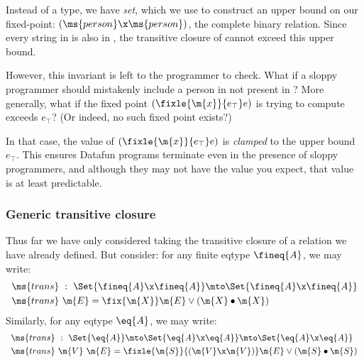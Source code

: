 Instead of a  type, we have  \emph{set}, which we use to
construct an upper bound on our fixed-point: $(\ms{person} \x \ms{person})$, the
complete binary relation. Since every string in  is also in
, the transitive closure of  cannot exceed this upper
bound.

However, this invariant is left to the programmer to check. What if a sloppy
programmer should mistakenly include a person in  not present in
? More generally, what if the fixed point $(\fixle{\m{x}}{e_\top} e)$
is trying to compute exceeds $e_\top$? (Or indeed, no such fixed point exists?)

In that case, the value of $(\fixle{\m{x}}{e_\top} e)$ is \emph{clamped} to the
upper bound $e_\top$. This ensures Datafun programs terminate even in the
presence of sloppy programmers, and although they may not have the value you
expect, that value is at least predictable.


\subsubsection{Generic transitive closure}

Thus far we have only considered taking the transitive closure of a relation we
have already defined. But consider: for any finite eqtype $\fineq{A}$, we may
write:
\[\begin{array}{l}
\ms{trans} ~:~ \Set{\fineq{A} \x \fineq{A}} \mto \Set{\fineq{A} \x \fineq{A}}
\vspace{0.3em}\\
\ms{trans}\ \m{E} = \fix{\m{X}} \m{E} \vee (\m{X} \bullet \m{X})
\end{array}\]
Similarly, for any eqtype $\eq{A}$, we may write:
\[\begin{array}{l}
\ms{trans} ~:~
\Set{\eq{A}} \mto \Set{\eq{A} \x \eq{A}} \mto \Set{\eq{A} \x \eq{A}}
\vspace{0.3em}\\
\ms{trans}\ \m{V}\ \m{E} = %
\fixle{\m{S}}{(\m{V} \x \m{V})} \m{E} \vee (\m{S} \bullet \m{S})
\end{array}\]

